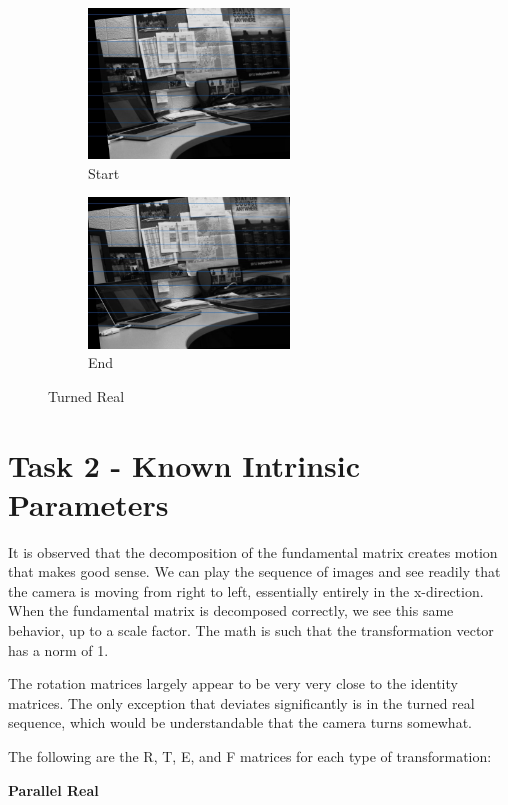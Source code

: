 \documentclass[10pt,a4paper]{article}
\begin{document}
\begin{figure}[h]
\centering
\begin{subfigure}{.5\textwidth}
  \centering
  \includegraphics[height=4cm,keepaspectratio]{turnRealS}
  \caption{Start}
  \label{fig:sub1}
\end{subfigure}%
\begin{subfigure}{.5\textwidth}
  \centering
  \includegraphics[height=4cm,keepaspectratio]{turnRealE}
  \caption{End}
  \label{fig:sub2}
\end{subfigure}
\label{fig:test}
\caption{Turned Real}
\end{figure}

\section*{Task 2 - Known Intrinsic Parameters}
It is observed that the decomposition of the fundamental matrix creates motion that makes good sense. We can play the sequence of images and see readily that the camera is moving from right to left, essentially entirely in the x-direction. When the fundamental matrix is decomposed correctly, we see this same behavior, up to a scale factor. The math is such that the transformation vector has a norm of 1. 

The rotation matrices largely appear to be very very close to the identity matrices. The only exception that deviates significantly is in the turned real sequence, which would be understandable that the camera turns somewhat. 

The following are the R, T, E, and F matrices for each type of transformation: 

\textbf{Parallel Real}
\end{document}
